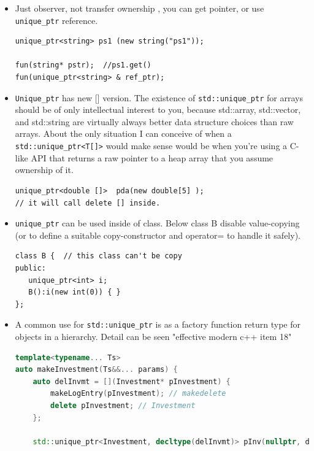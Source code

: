 \documentclass[a4paper,11pt,twoside]{book}
\begin{document}
\begin{itemize}
\item Just observer, not transfer ownership , you can get pointer, or use \texttt{unique\_ptr} reference.
\begin{lstlisting}[numbers=none]
unique_ptr<string> ps1 (new string("ps1"));

fun(string* pstr);  //ps1.get()
fun(unique_ptr<string> & ref_ptr);
\end{lstlisting}


\item \texttt{Unique\_ptr} has new [] version. The existence of \texttt{std::unique\_ptr} for arrays should be of only intellectual interest to you, because std::array, std::vector, and std::string are virtually always better data structure choices than raw arrays. About the only situation I can conceive of when a \texttt{std::unique\_ptr<T[]>} would make sense would be when you're using a C-like API that returns a raw pointer to a heap array that you assume ownership of it.
\begin{lstlisting}[numbers=none]
unique_ptr<double []>  pda(new double[5] );
// it will call delete [] inside.
\end{lstlisting}


    \item \texttt{unique\_ptr} can be used inside of class. Below class B disable value-copying (or to define a suitable copy-constructor  and operator= to handle it safely).
\begin{lstlisting}[numbers=none]
class B {  // this class can't be copy
public:
   unique_ptr<int> i;
   B():i(new int(0)) { }
};
\end{lstlisting}

    \item A common use for \texttt{std::unique\_ptr} is as a factory function return type for objects
in a hierarchy. Detail can be seen "effective modern c++ item 18"

\begin{lstlisting}[frame=single, language=c++, mathescape=true]
template<typename... Ts>
auto makeInvestment(Ts&&... params) {
	auto delInvmt = [](Investment* pInvestment) {
		makeLogEntry(pInvestment); // makedelete
		delete pInvestment; // Investment
	};

	std::unique_ptr<Investment, decltype(delInvmt)> pInv(nullptr, delInvmt);
	

\end{lstlisting}
\end{itemize}
\end{document}
